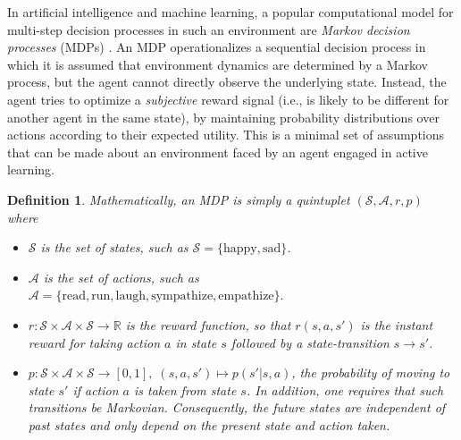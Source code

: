 \documentclass[10pt,letterpaper]{article}
\newtheorem*{definition*}{Definition}
\begin{document}
In artificial intelligence and machine learning, a popular computational model for
multi-step decision processes in such an environment are
\textit{Markov decision processes} (MDPs) \citep{sutton1998reinforcement}.
An MDP operationalizes a sequential decision process
in which it is assumed that environment dynamics are determined by a Markov process,
but the agent cannot directly observe the underlying state.
Instead, the agent tries to optimize a \textit{subjective} reward
signal (i.e., is likely to be different for another agent in the same state),
by maintaining probability distributions over actions according to their expected utility.
This is a minimal set of assumptions that can be made about an environment faced by an agent engaged in active learning.

\begin{definition*}
Mathematically, an MDP is simply a quintuplet $(\mathcal S, \mathcal A, r, p)$ where
\begin{itemize}
\item $\mathcal S$ is the set of states, such as $\mathcal S = \{\text{happy}, \text{sad}\}$.
\item $\mathcal A$ is the set of actions, such as $\mathcal A = \{\text{read}, \text{run},
  \text{laugh}, \text{sympathize}, \text{empathize}\}.$
\item $r : \mathcal S \times \mathcal A \times \mathcal S \rightarrow \mathbb R$ is the \textit{reward function},
   so that $r(s, a, s')$ is the instant reward for taking action $a$ in state $s$ followed by a state-transition $s \rightarrow s'$.
\item $p : \mathcal S \times \mathcal A \times \mathcal S \rightarrow [0, 1],\; (s,a,s') \mapsto p(s'|s,a)$,
  the probability of moving to state $s'$ if action $a$ is taken from state $s$. In addition, one requires that such
  transitions be Markovian. Consequently, the future states are independent of past states and only depend on the present state and action taken.
\end{itemize}
\end{definition*}
\end{document}

